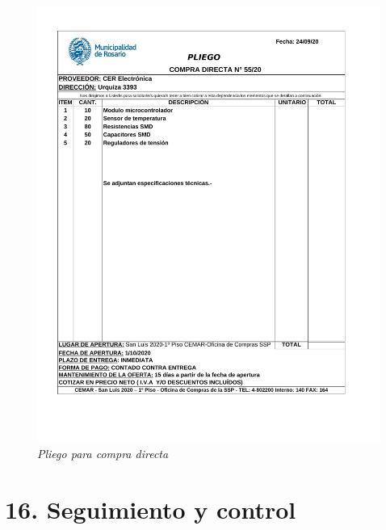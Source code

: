 \documentclass[11pt]{charter}
\begin{document}
\begin{figure}[htpb]
\centering 
\includegraphics[width=1\textwidth]{./Figuras/compra_directa.pdf}
\caption{\textit{Pliego para compra directa}}
\label{compra_directa}
\end{figure}

\section{16. Seguimiento y control}
\label{sec:seguimiento}
\end{document}
